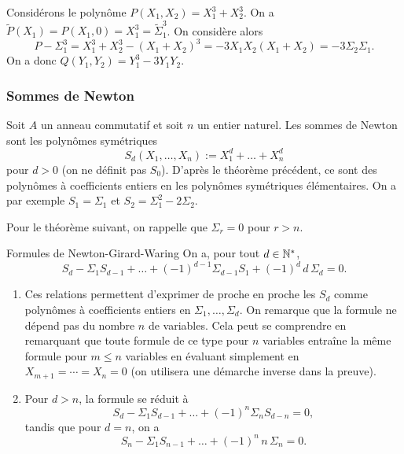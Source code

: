 \documentclass[]{report}
\begin{document}
\begin{ex}{}{}
    Considérons le polynôme $P(X_1, X_2) = X_1^3 + X_2^3$. On a $\tilde{P}(X_1) = P(X_1, 0) = X_1^3 = \tilde{\Sigma}_1^3$. On considère alors
    \[P - \Sigma_1^3 = X_1^3 + X_2^3 - (X_1 + X_2)^3 = -3X_1 X_2 (X_1 + X_2) = -3\Sigma_2 \Sigma_1.\]
    On a donc $Q(Y_1, Y_2) = Y_1^3 - 3Y_1 Y_2$.
\end{ex}

\subsubsection{Sommes de Newton}

Soit $A$ un anneau commutatif et soit $n$ un entier naturel. Les sommes de Newton sont les polynômes symétriques
\[S_d(X_1, \ldots, X_n) := X_1^d + \dots + X_n^d\]
pour $d > 0$ (on ne définit pas $S_0$). D'après le théorème précédent, ce sont des polynômes à coefficients entiers en les polynômes symétriques élémentaires. On a par exemple $S_1 = \Sigma_1$ et $S_2 = \Sigma_1^2 - 2\Sigma_2$.

Pour le théorème suivant, on rappelle que $\Sigma_r = 0$ pour $r > n$.

\begin{tm}{Formules de Newton-Girard-Waring}{}
    On a, pour tout $d \in \mathbb{N}^*$,
    \[S_d - \Sigma_1 S_{d-1} + \dots + (-1)^{d-1} \Sigma_{d-1} S_1 + (-1)^d \, d \, \Sigma_d = 0.\]
\end{tm}

\begin{re}{}{}
    \begin{enumerate}
        \item Ces relations permettent d'exprimer de proche en proche les $S_d$ comme polynômes à coefficients entiers en $\Sigma_1, \ldots, \Sigma_d$. On remarque que la formule ne dépend pas du nombre $n$ de variables. Cela peut se comprendre en remarquant que toute formule de ce type pour $n$ variables entraîne la même formule pour $m \le n$ variables en évaluant simplement en $X_{m+1} = \cdots = X_n = 0$ (on utilisera une démarche inverse dans la preuve).
        \item Pour $d > n$, la formule se réduit à
        \[S_d - \Sigma_1 S_{d-1} + \dots + (-1)^n \Sigma_n S_{d-n} = 0,\]
        tandis que pour $d = n$, on a
        \[S_n - \Sigma_1 S_{n-1} + \dots + (-1)^n \, n \, \Sigma_n = 0.\]
    \end{enumerate}
\end{re}
\end{document}
